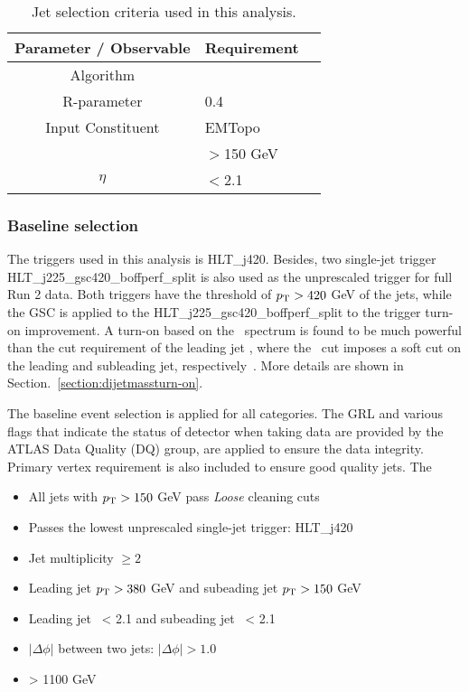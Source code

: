 \begin{table}[ht]
	\centering
		\begin{tabular}{clc}
			\hline
			Parameter / Observable & Requirement \\
			\hline
			Algorithm & \akt \\
			R-parameter & 0.4 \\
			Input Constituent & EMTopo\\
			\pt & $>$150 GeV \\
			\textbar$\eta$\textbar & $<$2.1 \\
			\hline
	\end{tabular}
\caption{Jet selection criteria used in this analysis.}
\label{tab:jetCalibration}
\end{table}


\subsubsection{Baseline selection}
\label{sec:base_selection}


The triggers used in this analysis is HLT\_j420. Besides, two single-jet trigger HLT\_j225\_gsc420\_boffperf\_split is also used as the unprescaled trigger for full Run 2 data. Both triggers have the threshold of $p_{\mathrm{T}} > 420$ GeV of the jets, while the GSC is applied to the HLT\_j225\_gsc420\_boffperf\_split to the trigger turn-on improvement. A turn-on based on the \mjj~spectrum is found to be much powerful than the cut requirement of the leading jet \pt, where the \mjj~cut imposes a soft cut on the leading and subleading jet, respectively~\cite{Nishu:2646455}. More details are shown in Section.~\ref{section:dijetmassturn-on}. 




The baseline event selection is applied for all categories. The GRL and various flags that indicate the status of detector when taking data are provided by the ATLAS Data Quality (DQ) group, are applied to ensure the data integrity. Primary vertex requirement is also included to ensure good quality jets. The  


\begin{itemize}
\item All jets with $p_{\mathrm{T}} > 150$ GeV pass \textit{Loose} cleaning cuts
\item Passes the lowest unprescaled single-jet trigger: HLT\_j420
\item Jet multiplicity $\ge 2$
\item Leading jet $p_{\mathrm{T}} > 380$ GeV and subeading jet $p_{\mathrm{T}} > 150$ GeV
\item Leading jet \abseta~< 2.1 and subeading jet \abseta~< 2.1 
\item $|\Delta\phi|$ between two jets: $|\Delta\phi| > 1.0$
\item \mjj > 1100 GeV
\end{itemize}

